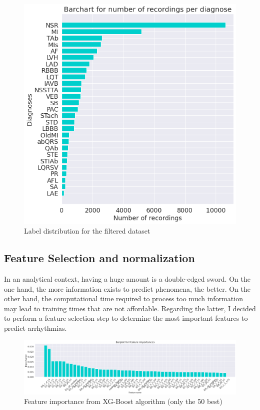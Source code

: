 \begin{figure}[H]
\centering
\includegraphics[scale=0.32]{img/label_ditro_filtered.png}
\caption{Label distribution for the filtered dataset}
\label{fig:label_ditro_filtered}
\end{figure}

\subsection{Feature Selection and normalization}\label{5fsn}

In an analytical context, having a huge amount is a double-edged sword. On the one hand, the more information exists to predict phenomena, the better. On the other hand, the computational time required to process too much information may lead to training times that are not affordable. Regarding the latter, I decided to perform a feature selection step to determine the most important features to predict arrhythmias. 

\begin{figure}[H]
\centering
\includegraphics[scale=0.22]{img/feature_importance.png}
\caption{Feature importance from XG-Boost algorithm (only the 50 best)}
\label{fig:feature_importance}
\end{figure}

